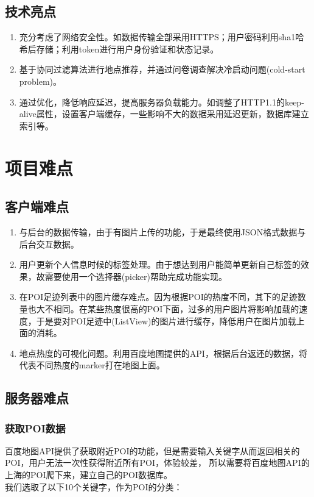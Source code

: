\documentclass[UTF8]{article}
\begin{document}
\subsection{技术亮点}
\begin{enumerate}
    \item 充分考虑了网络安全性。如数据传输全部采用HTTPS；用户密码利用sha1哈希后存储；利用token进行用户身份验证和状态记录。
    \item 基于协同过滤算法进行地点推荐，并通过问卷调查解决冷启动问题(cold-start problem)。
    \item 通过优化，降低响应延迟，提高服务器负载能力。如调整了HTTP1.1的keep-alive属性，设置客户端缓存，一些影响不大的数据采用延迟更新，数据库建立索引等。
\end{enumerate}

\section{项目难点}
\subsection{客户端难点}
\begin{enumerate}
    \item 与后台的数据传输，由于有图片上传的功能，于是最终使用JSON格式数据与后台交互数据。
    \item 用户更新个人信息时候的标签处理。由于想达到用户能简单更新自己标签的效果，故需要使用一个选择器(picker)帮助完成功能实现。
    \item 在POI足迹列表中的图片缓存难点。因为根据POI的热度不同，其下的足迹数量也大不相同。在某些热度很高的POI下面，过多的用户图片将影响加载的速度，于是要对POI足迹中(ListView)的图片进行缓存，降低用户在图片加载上面的消耗。
    \item 地点热度的可视化问题。利用百度地图提供的API，根据后台返还的数据，将代表不同热度的marker打在地图上面。
\end{enumerate}

\subsection{服务器难点}
\subsubsection{获取POI数据}
百度地图API提供了获取附近POI的功能，但是需要输入关键字从而返回相关的POI，用户无法一次性获得附近所有POI，体验较差，
所以需要将百度地图API的上海的POI爬下来，建立自己的POI数据库。\\
我们选取了以下10个关键字，作为POI的分类：
\end{document}
